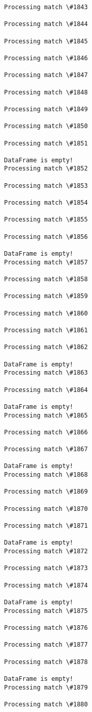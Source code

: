 \documentclass[11pt]{article}
\begin{document}
\begin{Verbatim}[commandchars=\\\{\}]
Processing match \#1843

Processing match \#1844

Processing match \#1845

Processing match \#1846

Processing match \#1847

Processing match \#1848

Processing match \#1849

Processing match \#1850

Processing match \#1851

DataFrame is empty!
Processing match \#1852

Processing match \#1853

Processing match \#1854

Processing match \#1855

Processing match \#1856

DataFrame is empty!
Processing match \#1857

Processing match \#1858

Processing match \#1859

Processing match \#1860

Processing match \#1861

Processing match \#1862

DataFrame is empty!
Processing match \#1863

Processing match \#1864

DataFrame is empty!
Processing match \#1865

Processing match \#1866

Processing match \#1867

DataFrame is empty!
Processing match \#1868

Processing match \#1869

Processing match \#1870

Processing match \#1871

DataFrame is empty!
Processing match \#1872

Processing match \#1873

Processing match \#1874

DataFrame is empty!
Processing match \#1875

Processing match \#1876

Processing match \#1877

Processing match \#1878

DataFrame is empty!
Processing match \#1879

Processing match \#1880


\end{Verbatim}
\end{document}
